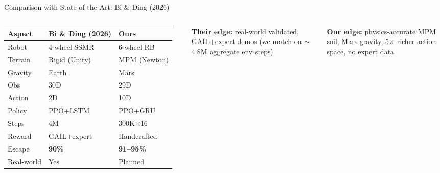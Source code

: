 \documentclass[aspectratio=169, 10pt]{beamer}
\newcommand{\teal}[1]{{\color{ArcticTeal}#1}}
\begin{document}
\begin{frame}{Comparison with State-of-the-Art: Bi \& Ding (2026)}
\vspace{0.1em}
\begin{columns}[T]
{\scriptsize\setlength{\tabcolsep}{4pt}
\begin{tabularx}{\linewidth}{@{}l X X@{}}
  \toprule
  \rowcolor{MarsRust!8}
  \color{StarWhite}\textbf{Aspect} &
  \color{MutedBlue}\textbf{Bi \& Ding (2026)} &
  \color{MarsLight}\textbf{Ours} \\
  \midrule
  \rowcolor{CardBg}
  Robot & 4-wheel SSMR & \teal{6-wheel RB} \\
  \rowcolor{SlideGray}
  Terrain & Rigid (Unity) & \teal{MPM (Newton)} \\
  \rowcolor{CardBg}
  Gravity & Earth & \teal{Mars} \\
  \rowcolor{SlideGray}
  Obs & 30D & 29D \\
  \rowcolor{CardBg}
  Action & 2D & \teal{10D} \\
  \rowcolor{SlideGray}
  Policy & PPO+LSTM & PPO+GRU \\
  \rowcolor{CardBg}
  Steps & 4M & 300K$\times$16 \\
  \rowcolor{SlideGray}
  Reward & GAIL+expert & \teal{Handcrafted} \\
  \rowcolor{CardBg}
  Escape & \textbf{90\%} & \teal{\textbf{91--95\%}} \\
  \rowcolor{SlideGray}
  Real-world & \teal{Yes} & Planned \\
  \bottomrule
\end{tabularx}
}

\vspace{0.3em}
\begin{tcolorbox}[highlight]
  \tiny
  \textbf{\faExclamationTriangle\; Their edge:} real-world validated, GAIL+expert demos (we match on $\sim$4.8M aggregate env steps)
\end{tcolorbox}
\vspace{0.2em}
\begin{tcolorbox}[greenbox]
  \tiny
  \textbf{\faCheckCircle\; Our edge:} physics-accurate MPM soil, Mars gravity, 5$\times$ richer action space, no expert data
\end{tcolorbox}


\end{columns}
\end{frame}
\end{document}
